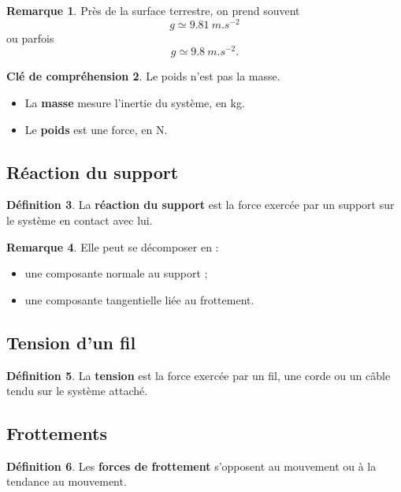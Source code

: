 \documentclass[11pt,a4paper]{article}
\theoremstyle{definition}
\newtheorem{definition}{Définition}[section]
\newtheorem{remarque}[definition]{Remarque}
\newtheorem{interpretation}[definition]{Clé de compréhension}
\theoremstyle{plain}
\theoremstyle{remark}
\begin{document}
\begin{remarque}
Près de la surface terrestre, on prend souvent
\[
g\simeq \SI{9,81}{m.s^{-2}}
\]
ou parfois
\[
g\simeq \SI{9,8}{m.s^{-2}}.
\]
\end{remarque}

\begin{interpretation}
Le poids n'est pas la masse.  
\begin{itemize}
    \item La \textbf{masse} mesure l'inertie du système, en \si{kg}.
    \item Le \textbf{poids} est une force, en \si{N}.
\end{itemize}
\end{interpretation}

\subsection{Réaction du support}

\begin{definition}
La \textbf{réaction du support} est la force exercée par un support sur le système en contact avec lui.
\end{definition}

\begin{remarque}
Elle peut se décomposer en :
\begin{itemize}
    \item une composante normale au support ;
    \item une composante tangentielle liée au frottement.
\end{itemize}
\end{remarque}

\subsection{Tension d'un fil}

\begin{definition}
La \textbf{tension} est la force exercée par un fil, une corde ou un câble tendu sur le système attaché.
\end{definition}

\subsection{Frottements}

\begin{definition}
Les \textbf{forces de frottement} s'opposent au mouvement ou à la tendance au mouvement.
\end{definition}
\end{document}
